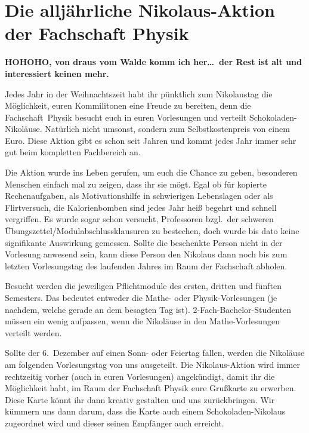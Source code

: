 \section{Die alljährliche Nikolaus-Aktion der Fachschaft Physik}

\begin{multicols}{2}
\textbf{HOHOHO, von draus vom Walde komm ich her\dots\ der Rest ist alt und interessiert keinen mehr.}

Jedes Jahr in der Weihnachtszeit habt ihr pünktlich zum Nikolaustag die Möglichkeit, euren Kommilitonen eine Freude zu bereiten, denn die Fachschaft~Physik besucht euch in euren Vorlesungen und verteilt Schokoladen-Nikoläuse. Natürlich nicht umsonst, sondern zum Selbstkostenpreis von einem Euro. Diese Aktion gibt es schon seit Jahren und kommt jedes Jahr immer sehr gut beim kompletten Fachbereich an.

Die Aktion wurde ins Leben gerufen, um euch die Chance zu geben, besonderen Menschen einfach mal zu zeigen, dass ihr sie mögt. Egal ob für kopierte Rechenaufgaben, als Motivationshilfe in schwierigen Lebenslagen oder als Flirtversuch, die Kalorienbomben sind jedes Jahr heiß begehrt und schnell vergriffen. Es wurde sogar schon versucht, Professoren bzgl.\ der schweren Übungszettel/Modulabschlussklausuren zu bestechen, doch wurde bis dato keine signifikante Auswirkung gemessen. Sollte die beschenkte Person nicht in der Vorlesung anwesend sein, kann diese Person den Nikolaus dann noch bis zum letzten Vorlesungstag des laufenden Jahres im Raum der Fachschaft abholen.

Besucht werden die jeweiligen Pflichtmodule des ersten, dritten und fünften Semesters. Das bedeutet entweder die Mathe- oder Physik-Vorlesungen (je nachdem, welche gerade an dem besagten Tag ist). 2-Fach-Bachelor-Studenten müssen ein wenig aufpassen, wenn die Nikoläuse in den Mathe-Vorlesungen verteilt werden.

Sollte der 6.\ Dezember auf einen Sonn- oder Feiertag fallen, werden die Nikoläuse am folgenden Vorlesungstag von uns ausgeteilt. Die Nikolaus-Aktion wird immer rechtzeitig vorher (auch in euren Vorlesungen) angekündigt, damit ihr die Möglichkeit habt, im Raum der Fachschaft Physik eure Grußkarte zu erwerben. Diese Karte könnt ihr dann kreativ gestalten und uns zurückbringen. Wir kümmern uns dann darum, dass die Karte auch einem Schokoladen-Nikolaus zugeordnet wird und dieser seinen Empfänger auch erreicht.

\end{multicols}
\vspace{-1em}
\vfill
{}
